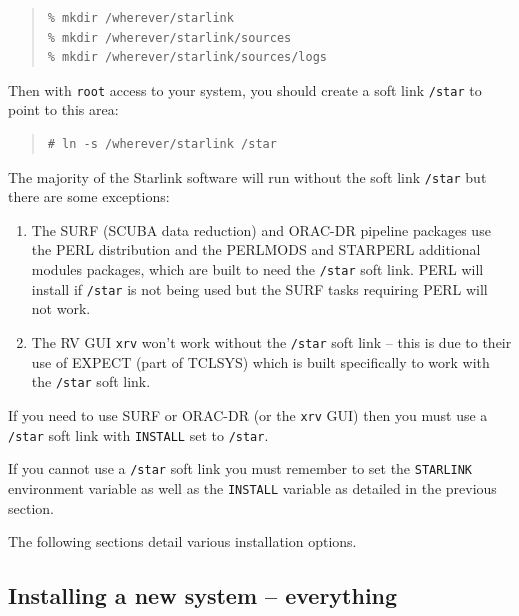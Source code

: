 \documentclass[twoside,11pt]{article}
\newcommand{\xlabel}[1]{}
\renewcommand{\_}{\texttt{\symbol{95}}}
\begin{document}
\begin{quote}
\begin{verbatim}
% mkdir /wherever/starlink
% mkdir /wherever/starlink/sources
% mkdir /wherever/starlink/sources/logs
\end{verbatim}
\end{quote}

Then with \texttt{root} access to your system, you should create a soft
link \texttt{/star} to point to this area:

\begin{quote}
\begin{verbatim}
# ln -s /wherever/starlink /star
\end{verbatim}
\end{quote}

The majority of the Starlink software will run without the soft
link \texttt{/star} but there are some exceptions:

\begin{enumerate}

\item The SURF (SCUBA data reduction) and ORAC-DR pipeline packages use the
PERL distribution and the PERLMODS and STARPERL additional modules packages,
which are built to need the \texttt{/star} soft link.  PERL will install
if \texttt{/star} is not being used but the SURF tasks requiring PERL
will not work.

\item The RV GUI \texttt{xrv} won't work without the \texttt{/star}
soft link -- this is due to their use of EXPECT (part of TCLSYS) which
is built specifically to work with the \texttt{/star} soft link.

\end{enumerate}

If you need to use SURF or ORAC-DR (or the \texttt{xrv} GUI) then you must use
a \texttt{/star} soft link with \texttt{INSTALL} set to \texttt{/star}.

If you cannot use a \texttt{/star} soft link you must remember to set the
\texttt{STARLINK} environment variable as well as the \texttt{INSTALL}
variable as detailed in the previous section.

The following sections detail various installation options.

\subsection{\xlabel{installing_a_new_system-everything}Installing a new system -- everything}
\label{installing_a_new_system-everything}
\end{document}
